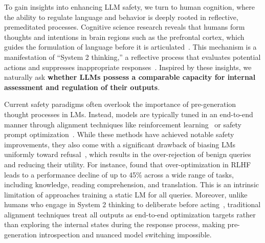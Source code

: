 To gain insights into enhancing LLM safety, we turn to human cognition, where the ability to regulate language and behavior is deeply rooted in reflective, premeditated processes. Cognitive science research reveals that humans form thoughts and intentions in brain regions such as the prefrontal cortex, which guides the formulation of language before it is articulated~\cite{friederici2011brain,fedorenko2016language}. This mechanism is a manifestation of ``System 2 thinking,'' a reflective process that evaluates potential actions and suppresses inappropriate responses~\cite{kahneman2011thinking}. Inspired by these insights, we naturally ask \textbf{whether LLMs possess a comparable capacity for internal assessment and regulation of their outputs}.



Current safety paradigms often overlook the importance of pre-generation thought processes in LMs. Instead, models are typically tuned in an end-to-end manner through alignment techniques like reinforcement learning~\cite{ouyang2022training,rafailov2024direct} or safety prompt optimization~\cite{zheng2024prompt}. While these methods have achieved notable safety improvements, they also come with a significant drawback of biasing LMs uniformly toward refusal~\cite{arditi2024refusal}, which results in the over-rejection of benign queries and reducing their utility. For instance, \citet{lin2024mitigating} found that over-optimization in RLHF leads to a performance decline of up to 45\% across a wide range of tasks, including knowledge, reading comprehension, and translation.
This is an intrinsic limitation of approaches training a static LM for all queries. Moreover, unlike humans who engage in System 2 thinking to deliberate before acting~\cite{kahneman2011thinking}, traditional alignment techniques treat all outputs as end-to-end optimization targets rather than exploring the internal states during the response process, making pre-generation introspection and nuanced model switching impossible. 

